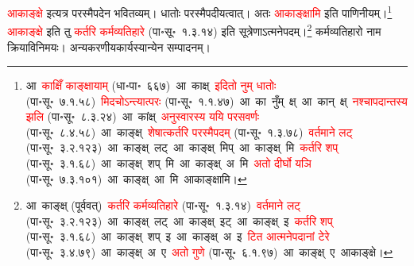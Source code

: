 \fontsize{14}{21}\selectfont\begin{sloppypar}\justifying\noindent\hspace{10mm} \textcolor{red}{आकाङ्क्षे} इत्यत्र परस्मैपदेन भवितव्यम्। धातोः परस्मैपदीयत्वात्। अतः \textcolor{red}{आकाङ्क्षामि} इति पाणिनीयम्।\footnote{आ~\textcolor{red}{काक्षिँ काङ्क्षायाम्} (धा॰पा॰~६६७)~\arrow आ~काक्ष्~\arrow \textcolor{red}{इदितो नुम् धातोः} (पा॰सू॰~७.१.५८)~\arrow \textcolor{red}{मिदचोऽन्त्यात्परः} (पा॰सू॰~१.१.४७)~\arrow आ~का~नुँम्~क्ष्~\arrow आ~कान्~क्ष्~\arrow \textcolor{red}{नश्चापदान्तस्य झलि} (पा॰सू॰~८.३.२४)~\arrow आ~कांक्ष्~\arrow \textcolor{red}{अनुस्वारस्य ययि परसवर्णः} (पा॰सू॰~८.४.५८)~\arrow आ~काङ्क्ष्~\arrow \textcolor{red}{शेषात्कर्तरि परस्मैपदम्} (पा॰सू॰~१.३.७८)~\arrow \textcolor{red}{वर्तमाने लट्} (पा॰सू॰~३.२.१२३)~\arrow आ~काङ्क्ष्~लट्~\arrow आ~काङ्क्ष्~मिप्~\arrow आ~काङ्क्ष्~मि~\arrow \textcolor{red}{कर्तरि शप्‌} (पा॰सू॰~३.१.६८)~\arrow आ~काङ्क्ष्~शप्~मि~\arrow आ~काङ्क्ष्~अ~मि~\arrow \textcolor{red}{अतो दीर्घो यञि} (पा॰सू॰~७.३.१०१)~\arrow आ~काङ्क्ष्~आ~मि~\arrow आकाङ्क्षामि।} \textcolor{red}{आकाङ्क्षे} इति तु \textcolor{red}{कर्तरि कर्म\-व्यतिहारे} (पा॰सू॰~१.३.१४) इति सूत्रेणाऽत्मनेपदम्।\footnote{आ~काङ्क्ष् (पूर्ववत्)~\arrow \textcolor{red}{कर्तरि कर्म\-व्यतिहारे} (पा॰सू॰~१.३.१४)~\arrow \textcolor{red}{वर्तमाने लट्} (पा॰सू॰~३.२.१२३)~\arrow आ~काङ्क्ष्~लट्~\arrow आ~काङ्क्ष्~इट्~\arrow आ~काङ्क्ष्~इ~\arrow \textcolor{red}{कर्तरि शप्‌} (पा॰सू॰~३.१.६८)~\arrow आ~काङ्क्ष्~शप्~इ~\arrow आ~काङ्क्ष्~अ~इ~\arrow \textcolor{red}{टित आत्मनेपदानां टेरे} (पा॰सू॰~३.४.७९)~\arrow आ~काङ्क्ष्~अ~ए~\arrow \textcolor{red}{अतो गुणे} (पा॰सू॰~६.१.९७)~\arrow आ~काङ्क्ष्~ए~\arrow आकाङ्क्षे।} कर्म\-व्यतिहारो नाम क्रिया\-विनिमयः।
अन्य\-करणीय\-कार्यस्यान्येन सम्पादनम्।

\end{sloppypar}
